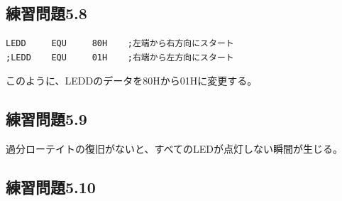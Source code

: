 \documentclass[a4paper,12pt]{ujarticle}
\begin{document}
  \subsection{練習問題5.8}
  \begin{lstlisting}[basicstyle=\ttfamily\footnotesize, frame=single]
LEDD     EQU     80H    ;左端から右方向にスタート
;LEDD    EQU     01H    ;右端から左方向にスタート
  \end{lstlisting}
  このように、LEDDのデータを80Hから01Hに変更する。
  \subsection{練習問題5.9}
  過分ローテイトの復旧がないと、すべてのLEDが点灯しない瞬間が生じる。
  \subsection{練習問題5.10}
  \clearpage
\end{document}
